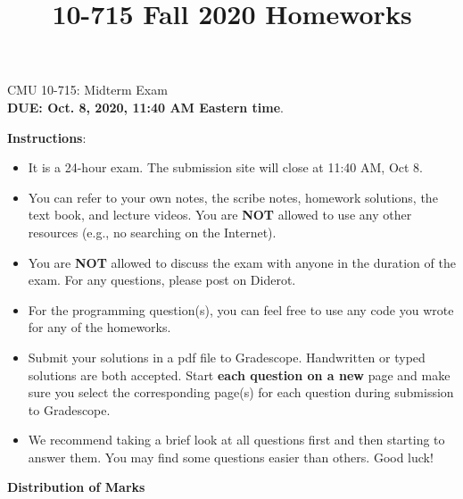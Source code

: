 \documentclass[letterpaper,12pt,addpoints]{exam}
\title{10-715 Fall 2020 Homeworks}
\begin{document}
\begin{center}
{\Large CMU 10-715: Midterm Exam}\\
{\bf DUE: Oct. 8, 2020, 11:40 AM Eastern time}.\\
\end{center}

\textbf{\large Instructions}:

\begin{itemize}
    \item It is a 24-hour exam. The submission site will close at 11:40 AM, Oct 8.

    \item You can refer to your own notes, the scribe notes, homework solutions, the text book, and lecture videos. You are \textbf{NOT} allowed to use any other resources (e.g., no searching on the Internet).
    
    \item You are \textbf{NOT} allowed to discuss the exam with anyone in the duration of the exam. For any questions, please post on Diderot.
    
    \item For the programming question(s), you can feel free to use any code you wrote for any of the homeworks. 
    
    \item Submit your solutions in a pdf file to Gradescope. Handwritten or typed solutions are both accepted. Start \textbf{each question on a new} page and make sure you select the corresponding page(s) for each question during submission to Gradescope. 
    
    \item We recommend taking a brief look at all questions first and then starting to answer them. You may find some questions easier than others. Good luck!
\end{itemize}

\begin{center}
\textbf{Distribution of Marks}\\
\medskip
\gradetable[v][questions]
\end{center}
\end{document}
